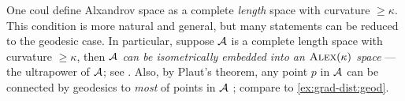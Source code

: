 One coul define Alxandrov space as a complete \textit{length} space with curvature $\ge \kappa$.
This condition is more natural and general, but many statements can be reduced to the geodesic case.
In particular, suppose $\mathcal{A}$ is a complete length space with curvature $\ge \kappa$,
then 
\textit{$\mathcal{A}$ can be isometrically embedded into an $\textsc{Alex}(\kappa)$ space} --- the ultrapower of $\mathcal{A}$; see \cite[4.11+8.4]{alexander-kapovitch-petrunin2024}.
Also, by Plaut's theorem, any point $p$ in $\mathcal{A}$ can be connected by geodesics to \textit{most} of points in $\mathcal{A}$
\cite[8.11]{alexander-kapovitch-petrunin2024}; compare to \ref{ex:grad-dist:geod}.

